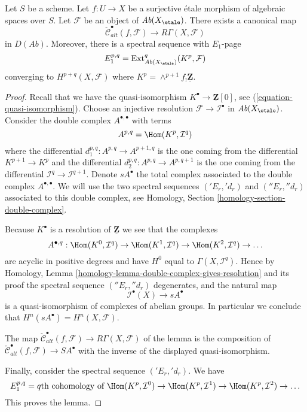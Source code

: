 \begin{lemma}
\label{lemma-alternating-cech-to-cohomology}
Let $S$ be a scheme. Let $f : U \to X$ be a surjective \'etale morphism
of algebraic spaces over $S$. Let $\mathcal{F}$ be an object of
$\textit{Ab}(X_\etale)$. There exists a canonical map
$$
\check{\mathcal{C}}^\bullet_{alt}(f, \mathcal{F})
\longrightarrow
R\Gamma(X, \mathcal{F})
$$
in $D(\textit{Ab})$. Moreover, there is a spectral sequence with $E_1$-page
$$
E_1^{p, q} =
\text{Ext}_{\textit{Ab}(X_\etale)}^q(K^p, \mathcal{F})
$$
converging to $H^{p + q}(X, \mathcal{F})$ where
$K^p = \wedge^{p + 1}f_!\underline{\mathbf{Z}}$.
\end{lemma}

\begin{proof}
Recall that we have the quasi-isomorphism
$K^\bullet \to \underline{\mathbf{Z}}[0]$, see
(\ref{equation-quasi-isomorphism}).
Choose an injective resolution $\mathcal{F} \to \mathcal{I}^\bullet$
in $\textit{Ab}(X_\etale)$. Consider the double complex
$A^{\bullet, \bullet}$ with terms
$$
A^{p, q} = \Hom(K^p, \mathcal{I}^q)
$$
where the differential $d_1^{p, q} : A^{p, q} \to A^{p + 1, q}$
is the one coming from the differential $K^{p + 1} \to K^p$
and the differential $d_2^{p, q} : A^{p, q} \to A^{p, q + 1}$ is the
one coming from the differential
$\mathcal{I}^q \to \mathcal{I}^{q + 1}$.
Denote $sA^\bullet$ the total complex associated to
the double complex $A^{\bullet, \bullet}$.
We will use the two spectral
sequences $({}'E_r, {}'d_r)$ and $({}''E_r, {}''d_r)$
associated to this double complex, see
Homology, Section \ref{homology-section-double-complex}.

\medskip\noindent
Because $K^\bullet$ is a resolution of $\underline{\mathbf{Z}}$
we see that the complexes
$$
A^{\bullet, q} :
\Hom(K^0, \mathcal{I}^q) \to
\Hom(K^1, \mathcal{I}^q) \to
\Hom(K^2, \mathcal{I}^q) \to \ldots
$$
are acyclic in positive degrees and have $H^0$ equal to
$\Gamma(X, \mathcal{I}^q)$. Hence by
Homology, Lemma \ref{homology-lemma-double-complex-gives-resolution}
and its proof the spectral sequence $({}''E_r, {}''d_r)$ degenerates,
and the natural map
$$
\mathcal{I}^\bullet(X) \longrightarrow sA^\bullet
$$
is a quasi-isomorphism of complexes of abelian groups. In particular
we conclude that $H^n(sA^\bullet) = H^n(X, \mathcal{F})$.

\medskip\noindent
The map $\check{\mathcal{C}}^\bullet_{alt}(f, \mathcal{F}) \to
R\Gamma(X, \mathcal{F})$ of the lemma is the composition of
$\check{\mathcal{C}}^\bullet_{alt}(f, \mathcal{F}) \to SA^\bullet$
with the inverse of the displayed quasi-isomorphism.

\medskip\noindent
Finally, consider the spectral sequence $({}'E_r, {}'d_r)$.
We have
$$
E_1^{p, q} = q\text{th cohomology of }
\Hom(K^p, \mathcal{I}^0) \to
\Hom(K^p, \mathcal{I}^1) \to
\Hom(K^p, \mathcal{I}^2) \to \ldots
$$
This proves the lemma.
\end{proof}


